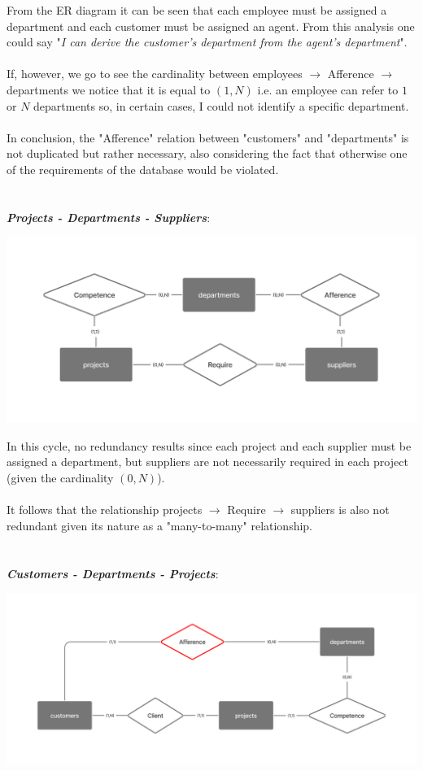 \documentclass[12pt,a4paper]{article}
\begin{document}
From the ER diagram it can be seen that each employee must be assigned a department and each customer must be assigned an agent. From this analysis one could say "\textit{I can derive the customer's department from the agent's department}".\\
\\
If, however, we go to see the cardinality between employees $\rightarrow$ Afference $\rightarrow$ departments we notice that it is equal to $(1,N)$ i.e. an employee can refer to $1$ or $N$ departments so, in certain cases, I could not identify a specific department.\\
\\
In conclusion, the "Afference" relation between "customers" and "departments" is not duplicated but rather necessary, also considering the fact that otherwise one of the requirements of the database would be violated.\\
\\
\\
\textbf{\textit{Projects - Departments - Suppliers}}:
\begin{center}
\includegraphics[width=0.6\columnwidth]{../../img/er_cycle_projects-departments-suppliers}
\end{center}
In this cycle, no redundancy results since each project and each supplier must be assigned a department, but suppliers are not necessarily required in each project (given the cardinality $(0,N)$).\\
\\
It follows that the relationship projects $\rightarrow$ Require $\rightarrow$ suppliers is also not redundant given its nature as a "many-to-many" relationship.\\
\\
\\
\textbf{\textit{Customers - Departments - Projects}}:
\begin{center}
\includegraphics[width=0.6\columnwidth]{../../img/er_cycle_customers-departments-projects}
\end{center}
\end{document}
